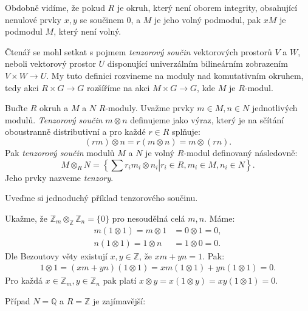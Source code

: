\documentclass[12pt]{report}
\begin{document}
Obdobně vidíme, že pokud $R$ je okruh, který není oborem integrity, obsahující nenulové prvky $x, y$ se součinem $0$, a $M$ je jeho volný podmodul, pak $x M$ je podmodul $M$, který není volný.

Čtenář se mohl setkat s pojmem \textit{tenzorový součin} vektorových prostorů $V$ a $W$, neboli vektorový prostor $U$ disponující univerzálním bilineárním zobrazením $V \times W \longrightarrow U$. My tuto definici rozvineme na moduly nad komutativním okruhem, tedy akci $R \times G \longrightarrow G$ rozšíříme na akci $M \times G \longrightarrow G$, kde $M$ je $R$-modul.

\begin{definice}
Buďte $R$ okruh a $M$ a $N$ $R$-moduly. Uvažme prvky $m \in M,n \in N$ jednotlivých modulů. \textit{Tenzorový součin} $m \otimes n$ definujeme jako výraz, který je na sčítání oboustranně distributivní a pro každé $r \in R$ splňuje:
\begin{equation*}
(rm) \otimes n = r (m \otimes n) = m \otimes (rn).
\end{equation*}
Pak \textit{tenzorový součin} modulů $M$ a $N$ je volný $R$-modul definovaný následovně:
\begin{equation*}
M  \otimes_R N = \left \lbrace \left. \sum r_i m_i \otimes n_i \right\vert r_i \in R, m_i \in M, n_i \in N \right \rbrace.
\end{equation*} 
Jeho prvky nazveme \textit{tenzory}.
\end{definice}

Uveďme si jednoduchý příklad tenzorového součinu. 

\begin{priklad}
Ukažme, že $\mathbb{Z}_m \otimes_{\mathbb{Z}} \mathbb{Z}_n = \lbrace 0 \rbrace$ pro nesoudělná celá $m,n$. Máme:
\begin{align*}
m (1 \otimes 1) = m \otimes 1  &= 0 \otimes 1 = 0,\\
n (1 \otimes 1) = 1 \otimes n &= 1 \otimes 0 = 0.
\end{align*}
Dle Bezoutovy věty existují $x,y \in \mathbb{Z}$, že $xm + yn = 1$. Pak:
\begin{align*}
1 \otimes 1 = (xm+yn)(1 \otimes 1) = xm (1 \otimes 1) + yn (1 \otimes 1) = 0.
\end{align*}
Pro každá $x \in \mathbb{Z}_m, y \in \mathbb{Z}_n$ pak platí $x \otimes y = x(1 \otimes y) = xy (1 \otimes 1)  = 0$.
\end{priklad}

Případ $N = \mathbb{Q}$ a $R = \mathbb{Z}$ je zajímavější:
\end{document}
